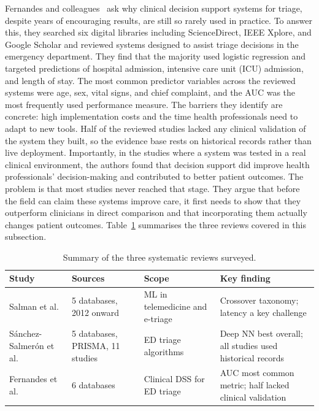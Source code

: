 \documentclass[11pt]{article}
\begin{document}
Fernandes and colleagues~\cite{Fernandes} ask why clinical decision support systems for triage, despite years of encouraging results, are still so rarely used in practice. To answer this, they searched six digital libraries including ScienceDirect, IEEE Xplore, and Google Scholar and reviewed systems designed to assist triage decisions in the emergency department. They find that the majority used logistic regression and targeted predictions of hospital admission, intensive care unit (ICU) admission, and length of stay. The most common predictor variables across the reviewed systems were age, sex, vital signs, and chief complaint, and the AUC was the most frequently used performance measure. The barriers they identify are concrete: high implementation costs and the time health professionals need to adapt to new tools. Half of the reviewed studies lacked any clinical validation of the system they built, so the evidence base rests on historical records rather than live deployment. Importantly, in the studies where a system was tested in a real clinical environment, the authors found that decision support did improve health professionals' decision-making and contributed to better patient outcomes. The problem is that most studies never reached that stage. They argue that before the field can claim these systems improve care, it first needs to show that they outperform clinicians in direct comparison and that incorporating them actually changes patient outcomes. Table~\ref{tab:reviews} summarises the three reviews covered in this subsection.

\begin{table}[H]
\centering
\caption{Summary of the three systematic reviews surveyed.}
\label{tab:reviews}
\begin{tabular}{p{3.5cm} p{2.8cm} p{3cm} p{2.8cm}}
\toprule
\textbf{Study} & \textbf{Sources} & \textbf{Scope} & \textbf{Key finding} \\
\midrule
Salman et al.~\cite{Salman2021} & 5 databases, 2012 onward & ML in telemedicine and e-triage & Crossover taxonomy; latency a key challenge \\
Sánchez-Salmerón et al.~\cite{Sanchez2022} & 5 databases, PRISMA, 11 studies & ED triage algorithms & Deep NN best overall; all studies used historical records \\
Fernandes et al.~\cite{Fernandes} & 6 databases & Clinical DSS for ED triage & AUC most common metric; half lacked clinical validation \\
\bottomrule
\end{tabular}
\end{table}
\end{document}
